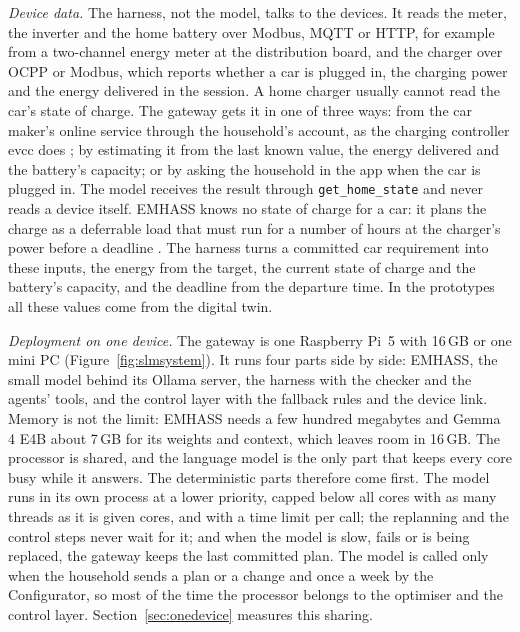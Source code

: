 \textit{Device data.} The harness, not the model, talks to the devices.
It reads the meter, the inverter and the home battery over Modbus, MQTT
or HTTP, for example from a two-channel energy meter at the
distribution board, and the charger over OCPP or Modbus, which reports
whether a car is plugged in, the charging power and the energy
delivered in the session. A home charger usually cannot read the car's
state of charge. The gateway gets it in one of three ways: from the car
maker's online service through the household's account, as the
charging controller evcc does \parencite{evccvehicle}; by estimating it
from the last known value, the energy delivered and the battery's
capacity; or by asking the household in the app when the car is
plugged in. The model receives the result through
\texttt{get\_home\_state} and never reads a device itself. EMHASS knows
no state of charge for a car: it plans the charge as a deferrable load
that must run for a number of hours at the charger's power before a
deadline \parencite{emhass}. The harness turns a committed car
requirement into these inputs, the energy from the target, the current
state of charge and the battery's capacity, and the deadline from the
departure time. In the prototypes all these values come from the
digital twin.

\textit{Deployment on one device.} The gateway is one Raspberry Pi~5
with 16\,GB or one mini PC (Figure~\ref{fig:slmsystem}). It runs four
parts side by side: EMHASS, the small model behind its Ollama server,
the harness with the checker and the agents' tools, and the control
layer with the fallback rules and the device link. Memory is not the
limit: EMHASS needs a few hundred megabytes and Gemma 4 E4B about
7\,GB for its weights and context, which leaves room in 16\,GB. The
processor is shared, and the language model is the only part that
keeps every core busy while it answers. The deterministic parts
therefore come first. The model runs in its own process at a lower
priority, capped below all cores with as many threads as it is given
cores, and with a time limit per call; the
replanning and the control steps never wait for it; and when the model
is slow, fails or is being replaced, the gateway keeps the last
committed plan. The model is called only when the household sends a
plan or a change and once a week by the Configurator, so most of the
time the processor belongs to the optimiser and the control layer.
Section~\ref{sec:onedevice} measures this sharing.

